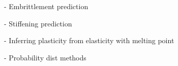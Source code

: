 - Embrittlement prediction

- Stiffening prediction

- Inferring plasticity from elasticity with melting point

- Probability dist methods

